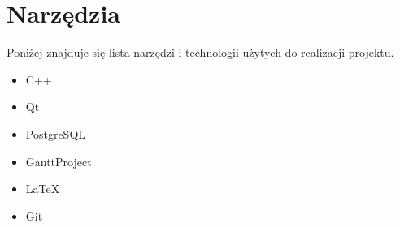 \chapter{Narzędzia}
\label{ap:3}

Poniżej znajduje się lista narzędzi i technologii użytych do realizacji projektu.

\begin{itemize}

\item C++
\item Qt
\item PostgreSQL
\item GanttProject
\item \LaTeX
\item Git

\end{itemize}